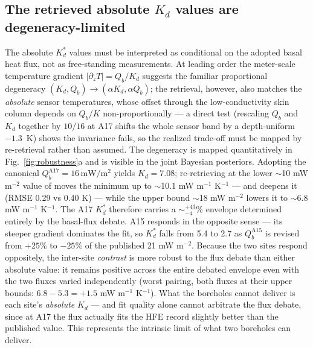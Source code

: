 \documentclass[11pt]{article}
\begin{document}
\subsection{The retrieved absolute $K_d$ values are degeneracy-limited}%
\label{sec:disc-degeneracy}
The absolute $K_d^{*}$ values must be interpreted as conditional on the
adopted basal heat flux, not as free-standing measurements. At leading order the meter-scale
temperature gradient $|\partial_z T|=Q_b/K_d$ suggests the familiar
proportional degeneracy $(K_d,Q_b)\!\to\!(\alpha K_d,\alpha Q_b)$; the
retrieval, however, also matches the \emph{absolute} sensor temperatures,
whose offset through the low-conductivity skin column depends on $Q_b/K$
non-proportionally --- a direct test (rescaling $Q_b$ and $K_d$ together
by $10/16$ at A17 shifts the whole sensor band by a depth-uniform
$-1.3$~K) shows the invariance fails, so the realized trade-off must be
mapped by re-retrieval rather than assumed. The degeneracy is mapped
quantitatively in Fig.~\ref{fig:robustness}a and is visible in the joint
Bayesian posteriors. Adopting the canonical
$Q_b^{\mathrm{A17}}=16\,\si{\milli\watt\per\meter\squared}$
\citep{langseth1976,nagihara2018} yields $K_d=7.08$;
re-retrieving at the
lower $\sim$10 mW m$^{-2}$ value of \citet{saito2007,nagihara2018} moves
the minimum up to $\sim$10.1 mW m$^{-1}$ K$^{-1}$ --- and deepens
it (RMSE 0.29 vs 0.40 K) --- while the upper bound $\sim$18 mW m$^{-2}$
lowers it to $\sim$6.8 mW m$^{-1}$ K$^{-1}$.
The A17 $K_d^{*}$ therefore carries a
$\sim$$^{+43}_{-4}\%$ envelope determined
entirely by the basal-flux debate. A15
responds in the opposite sense --- its steeper gradient dominates
the fit, so $K_d^{*}$ falls from 5.4 to 2.7 as $Q_b^{\mathrm{A15}}$ is
revised from $+25\%$ to $-25\%$ of the published 21 mW m$^{-2}$. Because
the two sites respond oppositely, the inter-site \emph{contrast} is more
robust to the flux debate than either absolute value: it remains positive
across the entire debated envelope even with the two fluxes varied
independently (worst pairing, both fluxes at their upper bounds: $6.8-5.3=+1.5$ mW m$^{-1}$ K$^{-1}$). What
the boreholes cannot deliver is each site's \emph{absolute} $K_d$ --- and
fit quality alone cannot arbitrate the flux debate, since at A17 the
\citet{saito2007} flux actually fits the HFE record slightly better than
the published value.
This represents the intrinsic limit of what two boreholes can deliver.
\end{document}

